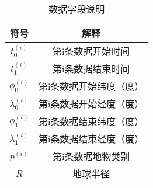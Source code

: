 \begin{table}[H]
\centering
\begin{tabular}{cc}
\toprule
\textbf{符号} & \textbf{解释} \\
\midrule
$t_0^{(i)}$ & 第i条数据开始时间 \\
$t_1^{(i)}$ & 第i条数据结束时间 \\
$\phi_0^{(i)}$ & 第i条数据开始纬度（度） \\
$\lambda_0^{(i)}$ & 第i条数据开始经度（度） \\
$\phi_1^{(i)}$ & 第i条数据结束纬度（度） \\
$\lambda_1^{(i)}$ & 第i条数据结束经度（度） \\
$p^{(i)}$ & 第i条数据地物类别 \\
$R$ & 地球半径\\
\bottomrule
\end{tabular}
\caption{数据字段说明}
\label{tab:data_fields}
\end{table}